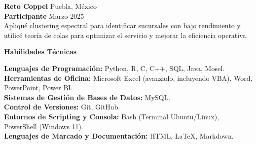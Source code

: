 \documentclass[9pt]{extarticle} %
\begin{document}
\textbf{Reto Coppel} \hfill Puebla, México\\  
\textbf{Participante} \hfill Marzo 2025\\  
Apliqué clustering espectral para identificar sucursales con bajo rendimiento y utilicé teoría de colas para optimizar el servicio y mejorar la eficiencia operativa.

\begin{center}  
    \vspace{1ex}  
    \textbf{Habilidades Técnicas}  
    \vspace{-1ex}  
\end{center}

\textbf{Lenguajes de Programación:} Python, R, C, C++, SQL, Java, Mosel.\\  
\textbf{Herramientas de Oficina:} Microsoft Excel (avanzado, incluyendo VBA), Word, PowerPoint, Power BI.\\  
\textbf{Sistemas de Gestión de Bases de Datos:} MySQL.\\  
\textbf{Control de Versiones:} Git, GitHub.\\  
\textbf{Entornos de Scripting y Consola:} Bash (Terminal Ubuntu/Linux), PowerShell (Windows 11).\\  
\textbf{Lenguajes de Marcado y Documentación:} HTML, LaTeX, Markdown.\\
\end{document}
